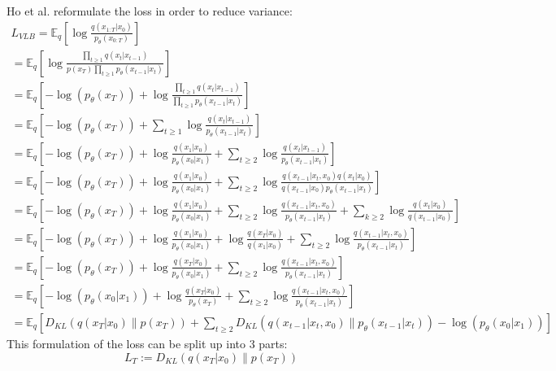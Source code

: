 \documentclass{article}
\begin{document}
Ho et al. \cite{ho2020denoising} reformulate the loss in order to reduce variance:
\begin{gather}
  L_{VLB} = \mathbb{E}_q [\log \frac{q(x_{1:T}|x_0)}{p_{\theta}(x_{0:T})}] \label{eq:17} \\
  = \mathbb{E}_q [\log \frac{\prod_{t \geq 1} q(x_t | x_{t-1})}{p(x_T) \prod_{t \geq 1} p_{\theta}(x_{t-1} | x_t)}] \label{eq:18} \\
  = \mathbb{E}_q [-\log(p_{\theta}(x_T)) + \log \frac{\prod_{t \geq 1} q(x_t | x_{t-1})}{\prod_{t \geq 1} p_{\theta}(x_{t-1} | x_t)}] \label{eq:19} \\
  = \mathbb{E}_q [-\log(p_{\theta}(x_T)) + \sum_{t \geq 1} \log \frac{q(x_t | x_{t-1})}{p_{\theta}(x_{t-1} | x_t)}] \label{eq:20} \\
  = \mathbb{E}_q [-\log(p_{\theta}(x_T)) + \log \frac{q(x_1 | x_0)}{p_{\theta}(x_0 | x_1)} + \sum_{t \geq 2} \log \frac{q(x_t | x_{t-1})}{p_{\theta}(x_{t-1} | x_t)}] \label{eq:21} \\
  = \mathbb{E}_q [-\log(p_{\theta}(x_T)) + \log \frac{q(x_1 | x_0)}{p_{\theta}(x_0 | x_1)} + \sum_{t \geq 2} \log \frac{q(x_{t-1} | x_t, x_0) q(x_t | x_0)}{{q(x_{t-1} | x_0)} p_{\theta}(x_{t-1} | x_t)}] \label{eq:22} \\
  = \mathbb{E}_q [-\log(p_{\theta}(x_T)) + \log \frac{q(x_1 | x_0)}{p_{\theta}(x_0 | x_1)} + \sum_{t \geq 2} \log \frac{q(x_{t-1} | x_t, x_0)}{p_{\theta}(x_{t-1} | x_t)} + \sum_{k \geq 2} \log \frac{q(x_t | x_0)}{q(x_{t-1} | x_0)}] \label{eq:23} \\
  = \mathbb{E}_q [-\log(p_{\theta}(x_T)) + \log \frac{q(x_1 | x_0)}{p_{\theta}(x_0 | x_1)} + \log \frac{q(x_T | x_0)}{q(x_1 | x_0)} + \sum_{t \geq 2} \log \frac{q(x_{t-1} | x_t, x_0)}{p_{\theta}(x_{t-1} | x_t)}] \label{eq:24} \\
  = \mathbb{E}_q [-\log(p_{\theta}(x_T)) + \log \frac{q(x_T | x_0)}{p_{\theta}(x_0 | x_1)} + \sum_{t \geq 2} \log \frac{q(x_{t-1} | x_t, x_0)}{p_{\theta}(x_{t-1} | x_t)}] \label{eq:25} \\
  = \mathbb{E}_q [- \log(p_{\theta}(x_0 | x_1)) + \log \frac{q(x_T | x_0)}{p_{\theta}(x_T)} + \sum_{t \geq 2} \log \frac{q(x_{t-1} | x_t, x_0)}{p_{\theta}(x_{t-1} | x_t)}] \label{eq:26} \\
  = \mathbb{E}_q [ D_{KL}(q(x_T | x_0) \| p(x_T)) + \sum_{t \geq 2} D_{KL}(q(x_{t-1} | x_t, x_0) \| p_{\theta}(x_{t-1} | x_t)) - \log(p_{\theta}(x_0 | x_1))] \label{eq:27}
\end{gather}
This formulation of the loss can be split up into 3 parts:
$$ L_T := D_{KL}(q(x_T | x_0) \| p(x_T)) $$
\end{document}
